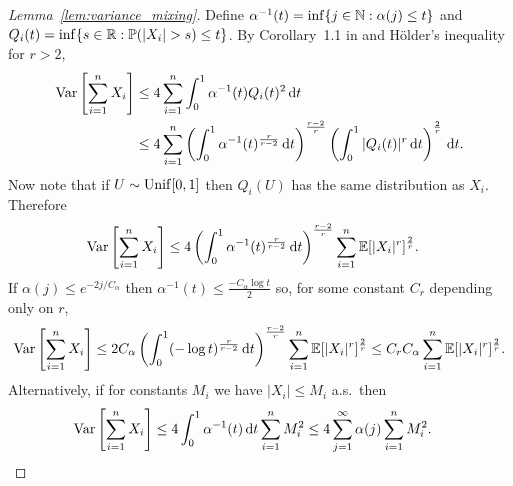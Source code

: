 \begin{proof}[Lemma~\ref{lem:variance_mixing}]

  Define
  $\alpha^{-1}(t) =
  \inf\{j \in \mathbb{N} : \alpha(j) \leq t\}$
  and
  $Q_i(t) = \inf\{s \in \mathbb{R} : \mathbb{P}(|X_i| > s) \leq t\}$.
  By Corollary~1.1 in \citet{rio2017asymptotic}
  and H{\"o}lder's inequality for $r > 2$,
  \begin{align*}
    \operatorname{Var}\left[
      \sum_{i=1}^n X_i
    \right]
    &\leq
    4 \sum_{i=1}^n
    \int_0^1 \alpha^{-1}(t)
    Q_i(t)^2 \,\mathrm{d}t \\
    &\leq
    4 \sum_{i=1}^n
    \left(
      \int_0^1 \alpha^{-1}(t)^{\frac{r}{r-2}} \,\mathrm{d}t
    \right)^{\frac{r-2}{r}}
    \left(
      \int_0^1 |Q_i(t)|^r \,\mathrm{d}t
    \right)^{\frac{2}{r}}
    \,\mathrm{d}t.
  \end{align*}
  Now note that if $U \sim \operatorname{Unif}[0,1]$ then
  $Q_i(U)$ has the same distribution as $X_i$.
  Therefore
  \begin{align*}
    \operatorname{Var}\left[
      \sum_{i=1}^n X_i
    \right]
    &\leq
    4
    \left(
      \int_0^1 \alpha^{-1}(t)^{\frac r{r-2}} \,\mathrm{d}t
    \right)^{\frac{r-2}r}
    \sum_{i=1}^n
    \mathbb{E}[|X_i|^r]^{\frac 2 r}.
  \end{align*}
  If $\alpha(j) \leq e^{-2j/C_\alpha}$ then
  $\alpha^{-1}(t) \leq \frac{-C_\alpha \log t}{2}$
  so, for some constant
  $C_r$ depending only on $r$,
  \begin{align*}
    \operatorname{Var}\left[
      \sum_{i=1}^n X_i
    \right]
    \leq
    2 C_\alpha
    \left(
      \int_0^1 (-\log t)^{\frac r{r-2}} \,\mathrm{d}t
    \right)^{\frac{r-2} r}
    \sum_{i=1}^n
    \mathbb{E}[|X_i|^r]^{\frac 2 r}
    \leq
    C_r C_\alpha
    \sum_{i=1}^n
    \mathbb{E}[|X_i|^r]^{\frac 2 r}.
  \end{align*}
  Alternatively, if for constants $M_i$ we have
  $|X_i| \leq M_i$ a.s.\ then
  \begin{align*}
    \operatorname{Var}\left[
      \sum_{i=1}^n X_i
    \right]
    &\leq
    4 \int_0^1 \alpha^{-1}(t)
    \,\mathrm{d}t
    \sum_{i=1}^n M_i^2
    \leq
    4 \sum_{j=1}^\infty \alpha(j)
    \sum_{i=1}^n M_i^2.
  \end{align*}
\end{proof}

